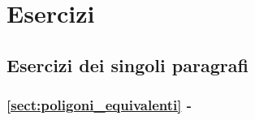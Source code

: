 
\section{Esercizi}

\subsection{Esercizi dei singoli paragrafi}

\begingroup
\hypersetup{linkcolor=black}
\subsubsection*{\ref{sect:poligoni_equivalenti} - }
\endgroup

